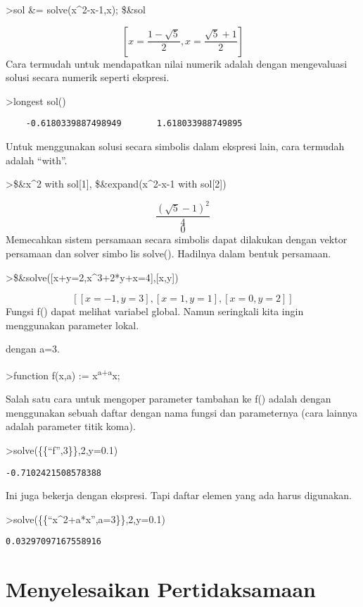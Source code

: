 \documentclass[
]{book}
\begin{document}
\textgreater sol \&= solve(x\^{}2-x-1,x); \$\&sol

\[\left[ x=\frac{1-\sqrt{5}}{2} , x=\frac{\sqrt{5}+1}{2} \right] \]Cara termudah untuk mendapatkan nilai numerik adalah dengan mengevaluasi solusi secara numerik seperti ekspresi.

\textgreater longest sol()

\begin{verbatim}
    -0.6180339887498949       1.618033988749895 
\end{verbatim}

Untuk menggunakan solusi secara simbolis dalam ekspresi lain, cara termudah adalah ``with''.

\textgreater\$\&x\^{}2 with sol{[}1{]}, \$\&expand(x\^{}2-x-1 with sol{[}2{]})

\[\frac{\left(\sqrt{5}-1\right)^2}{4}\]\[0\]Memecahkan sistem persamaan secara simbolis dapat dilakukan dengan vektor persamaan dan solver simbolis solve(). Hadilnya dalam bentuk persamaan.

\textgreater\$\&solve({[}x+y=2,x\^{}3+2*y+x=4{]},{[}x,y{]})

\[\left[ \left[ x=-1 , y=3 \right]  , \left[ x=1 , y=1 \right]  , 
 \left[ x=0 , y=2 \right]  \right] \]Fungsi f() dapat melihat variabel global. Namun seringkali kita ingin menggunakan parameter lokal.

dengan a=3.

\textgreater function f(x,a) := x\textsuperscript{a+a}x;

Salah satu cara untuk mengoper parameter tambahan ke f() adalah dengan menggunakan sebuah daftar dengan nama fungsi dan parameternya (cara lainnya adalah parameter titik koma).

\textgreater solve(\{\{``f'',3\}\},2,y=0.1)

\begin{verbatim}
-0.7102421508578388
\end{verbatim}

Ini juga bekerja dengan ekspresi. Tapi daftar elemen yang ada harus digunakan.

\textgreater solve(\{\{``x\^{}2+a*x'',a=3\}\},2,y=0.1)

\begin{verbatim}
0.03297097167558916
\end{verbatim}

\chapter{Menyelesaikan Pertidaksamaan}\label{menyelesaikan-pertidaksamaan}
\end{document}
